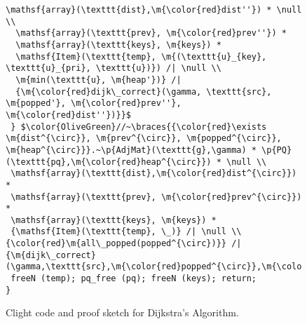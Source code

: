 \begin{figure}[t]
\begin{lstlisting}[mathescape=true,showlines=true]
  \mathsf{array}(\texttt{dist},\m{\color{red}dist''}) * \null \\
  \mathsf{array}(\texttt{prev}, \m{\color{red}prev''}) *
  \mathsf{array}(\texttt{keys}, \m{keys}) *
  \mathsf{Item}(\texttt{temp}, \m{(\texttt{u}_{key}, \texttt{u}_{pri}, \texttt{u})}) /| \null \\
  \m{min(\texttt{u}, \m{heap'})} /|
  {\m{\color{red}dijk\_correct}(\gamma, \texttt{src}, \m{popped'}, \m{\color{red}prev''}, \m{\color{red}dist''})}}$
 } $\color{OliveGreen}//~\braces{{\color{red}\exists \m{dist^{\circ}}, \m{prev^{\circ}}, \m{popped^{\circ}}, \m{heap^{\circ}}}.~\p{AdjMat}(\texttt{g},\gamma) * \p{PQ}(\texttt{pq},\m{\color{red}heap^{\circ}}) * \null \\
 \mathsf{array}(\texttt{dist},\m{\color{red}dist^{\circ}}) * 
 \mathsf{array}(\texttt{prev}, \m{\color{red}prev^{\circ}}) *
 \mathsf{array}(\texttt{keys}, \m{keys}) * 
 {\mathsf{Item}(\texttt{temp}, \_)} /| \null \\
{\color{red}\m{all\_popped(popped^{\circ})}} /|
{\m{dijk\_correct}(\gamma,\texttt{src},\m{\color{red}popped^{\circ}},\m{\color{red}prev^{\circ}},\m{\color{red}dist^{\circ}})}}$
 freeN (temp); pq_free (pq); freeN (keys); return; 
}
\end{lstlisting}
\vspace{-1em}
\caption{Clight code and proof sketch for Dijkstra's Algorithm.}
\vspace{-1em}
\label{fig:decorated}
\end{figure} 